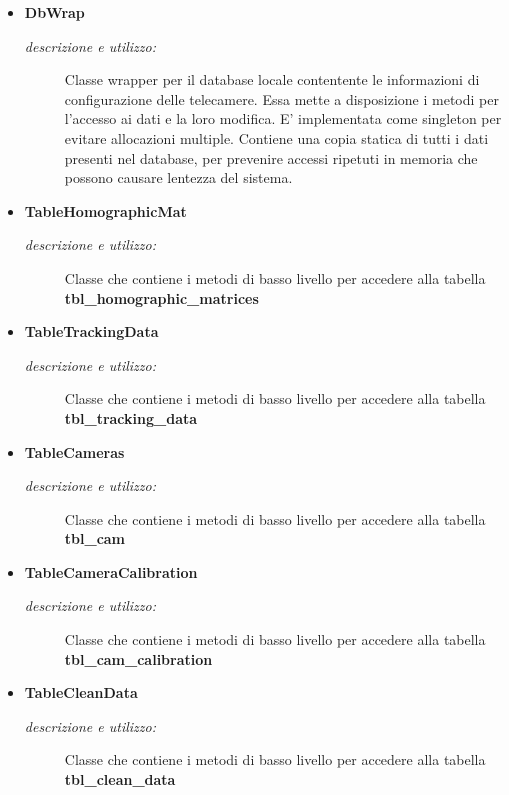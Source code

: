 \begin{itemize} 
\item \textbf{DbWrap}
\begin{description}
\item [\textit{descrizione e utilizzo:}] Classe wrapper per il database locale contentente le informazioni di configurazione delle telecamere. Essa mette a disposizione i metodi per l'accesso ai dati e la loro modifica. E' implementata come singleton per evitare allocazioni multiple. Contiene una copia statica di tutti i dati presenti nel database, per prevenire accessi ripetuti in memoria che possono causare lentezza del sistema.
\end{description}
\item \textbf{TableHomographicMat}
\begin{description}
\item [\textit{descrizione e utilizzo:}] Classe che contiene i metodi di basso livello per accedere alla tabella \textbf{tbl\_homographic\_matrices}
\end{description}
\item \textbf{TableTrackingData}
\begin{description}
\item [\textit{descrizione e utilizzo:}] Classe che contiene i metodi di basso livello per accedere alla tabella \textbf{tbl\_tracking\_data}
\end{description}
\item \textbf{TableCameras}
\begin{description}
\item [\textit{descrizione e utilizzo:}] Classe che contiene i metodi di basso livello per accedere alla tabella \textbf{tbl\_cam}
\end{description}
\item \textbf{TableCameraCalibration}
\begin{description}
\item [\textit{descrizione e utilizzo:}] Classe che contiene i metodi di basso livello per accedere alla tabella \textbf{tbl\_cam\_calibration}
\end{description}
\item \textbf{TableCleanData}
\begin{description}
\item [\textit{descrizione e utilizzo:}] Classe che contiene i metodi di basso livello per accedere alla tabella \textbf{tbl\_clean\_data}
\end{description}
\end{itemize}


